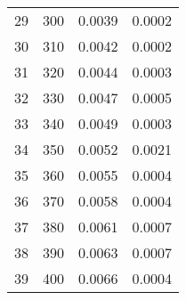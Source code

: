 \begin{table}[H]
\begin{tabular}{cccc}
\cline{1-4}
29 & 300 & 0.0039 & 0.0002 \\
\cline{1-4}
30 & 310 & 0.0042 & 0.0002 \\
\cline{1-4}
31 & 320 & 0.0044 & 0.0003 \\
\cline{1-4}
32 & 330 & 0.0047 & 0.0005 \\
\cline{1-4}
33 & 340 & 0.0049 & 0.0003 \\
\cline{1-4}
34 & 350 & 0.0052 & 0.0021 \\
\cline{1-4}
35 & 360 & 0.0055 & 0.0004 \\
\cline{1-4}
36 & 370 & 0.0058 & 0.0004 \\
\cline{1-4}
37 & 380 & 0.0061 & 0.0007 \\
\cline{1-4}
38 & 390 & 0.0063 & 0.0007 \\
\cline{1-4}
39 & 400 & 0.0066 & 0.0004 \\
\cline{1-4}
\end{tabular}
\end{table}
